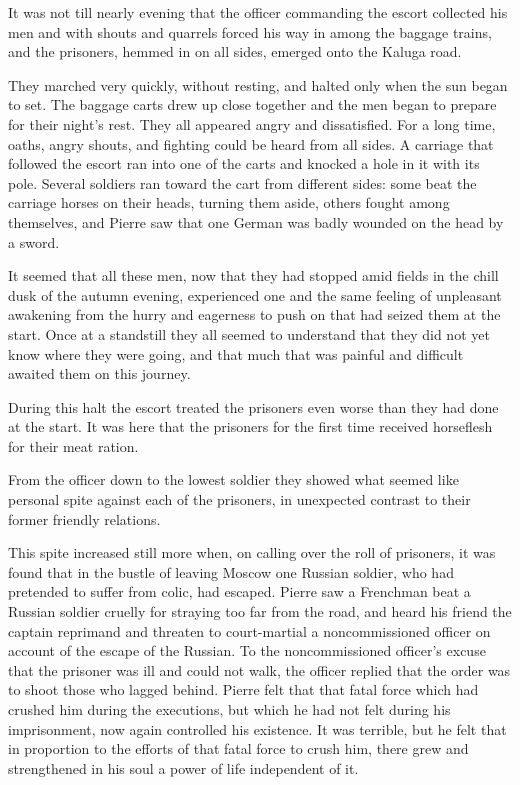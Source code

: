 It was not till nearly evening that the officer commanding the
escort collected his men and with shouts and quarrels forced his
way in among the baggage trains, and the prisoners, hemmed in on
all sides, emerged onto the Kaluga road.

They marched very quickly, without resting, and halted only when
the sun began to set. The baggage carts drew up close together
and the men began to prepare for their night's rest. They all
appeared angry and dissatisfied. For a long time, oaths, angry
shouts, and fighting could be heard from all sides. A carriage
that followed the escort ran into one of the carts and knocked a
hole in it with its pole. Several soldiers ran toward the cart
from different sides: some beat the carriage horses on their
heads, turning them aside, others fought among themselves, and
Pierre saw that one German was badly wounded on the head by a
sword.

It seemed that all these men, now that they had stopped amid
fields in the chill dusk of the autumn evening, experienced one
and the same feeling of unpleasant awakening from the hurry and
eagerness to push on that had seized them at the start. Once at a
standstill they all seemed to understand that they did not yet
know where they were going, and that much that was painful and
difficult awaited them on this journey.

During this halt the escort treated the prisoners even worse than
they had done at the start. It was here that the prisoners for
the first time received horseflesh for their meat ration.

From the officer down to the lowest soldier they showed what
seemed like personal spite against each of the prisoners, in
unexpected contrast to their former friendly relations.

This spite increased still more when, on calling over the roll of
prisoners, it was found that in the bustle of leaving Moscow one
Russian soldier, who had pretended to suffer from colic, had
escaped. Pierre saw a Frenchman beat a Russian soldier cruelly
for straying too far from the road, and heard his friend the
captain reprimand and threaten to court-martial a noncommissioned
officer on account of the escape of the Russian. To the
noncommissioned officer's excuse that the prisoner was ill and
could not walk, the officer replied that the order was to shoot
those who lagged behind. Pierre felt that that fatal force which
had crushed him during the executions, but which he had not felt
during his imprisonment, now again controlled his existence. It
was terrible, but he felt that in proportion to the efforts of
that fatal force to crush him, there grew and strengthened in his
soul a power of life independent of it.


